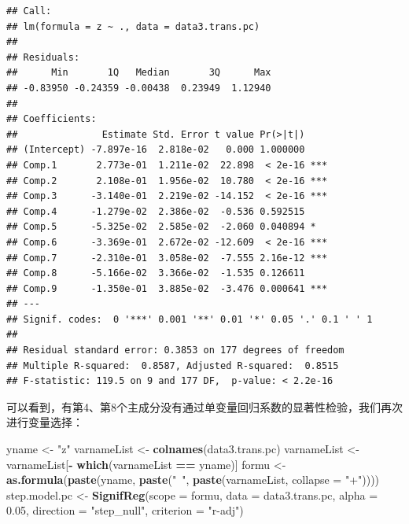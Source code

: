 \documentclass[]{article}
\newenvironment{Shaded}{\begin{snugshade}}{\end{snugshade}}
\newcommand{\KeywordTok}[1]{\textcolor[rgb]{0.13,0.29,0.53}{\textbf{#1}}}
\newcommand{\DataTypeTok}[1]{\textcolor[rgb]{0.13,0.29,0.53}{#1}}
\newcommand{\FloatTok}[1]{\textcolor[rgb]{0.00,0.00,0.81}{#1}}
\newcommand{\StringTok}[1]{\textcolor[rgb]{0.31,0.60,0.02}{#1}}
\newcommand{\OperatorTok}[1]{\textcolor[rgb]{0.81,0.36,0.00}{\textbf{#1}}}
\newcommand{\NormalTok}[1]{#1}
\begin{document}
\begin{verbatim}
## Call:
## lm(formula = z ~ ., data = data3.trans.pc)
## 
## Residuals:
##      Min       1Q   Median       3Q      Max 
## -0.83950 -0.24359 -0.00438  0.23949  1.12940 
## 
## Coefficients:
##               Estimate Std. Error t value Pr(>|t|)    
## (Intercept) -7.897e-16  2.818e-02   0.000 1.000000    
## Comp.1       2.773e-01  1.211e-02  22.898  < 2e-16 ***
## Comp.2       2.108e-01  1.956e-02  10.780  < 2e-16 ***
## Comp.3      -3.140e-01  2.219e-02 -14.152  < 2e-16 ***
## Comp.4      -1.279e-02  2.386e-02  -0.536 0.592515    
## Comp.5      -5.325e-02  2.585e-02  -2.060 0.040894 *  
## Comp.6      -3.369e-01  2.672e-02 -12.609  < 2e-16 ***
## Comp.7      -2.310e-01  3.058e-02  -7.555 2.16e-12 ***
## Comp.8      -5.166e-02  3.366e-02  -1.535 0.126611    
## Comp.9      -1.350e-01  3.885e-02  -3.476 0.000641 ***
## ---
## Signif. codes:  0 '***' 0.001 '**' 0.01 '*' 0.05 '.' 0.1 ' ' 1
## 
## Residual standard error: 0.3853 on 177 degrees of freedom
## Multiple R-squared:  0.8587, Adjusted R-squared:  0.8515 
## F-statistic: 119.5 on 9 and 177 DF,  p-value: < 2.2e-16
\end{verbatim}

可以看到，有第4、第8个主成分没有通过单变量回归系数的显著性检验，我们再次进行变量选择：

\begin{Shaded}
\begin{Highlighting}[]
\NormalTok{yname <-}\StringTok{ "z"}
\NormalTok{varnameList <-}\StringTok{ }\KeywordTok{colnames}\NormalTok{(data3.trans.pc)}
\NormalTok{varnameList <-}\StringTok{ }\NormalTok{varnameList[}\OperatorTok{-}\StringTok{ }\KeywordTok{which}\NormalTok{(varnameList }\OperatorTok{==}\StringTok{ }\NormalTok{yname)]}
\NormalTok{formu <-}\StringTok{ }\KeywordTok{as.formula}\NormalTok{(}\KeywordTok{paste}\NormalTok{(yname, }\KeywordTok{paste}\NormalTok{(}\StringTok{"~"}\NormalTok{, }\KeywordTok{paste}\NormalTok{(varnameList, }\DataTypeTok{collapse =} \StringTok{"+"}\NormalTok{))))}
\NormalTok{step.model.pc <-}\StringTok{ }\KeywordTok{SignifReg}\NormalTok{(}\DataTypeTok{scope =}\NormalTok{ formu, }\DataTypeTok{data =}\NormalTok{ data3.trans.pc, }\DataTypeTok{alpha =} \FloatTok{0.05}\NormalTok{, }
                           \DataTypeTok{direction =} \StringTok{"step_null"}\NormalTok{, }\DataTypeTok{criterion =} \StringTok{"r-adj"}\NormalTok{)}
\end{Highlighting}
\end{Shaded}
\end{document}
